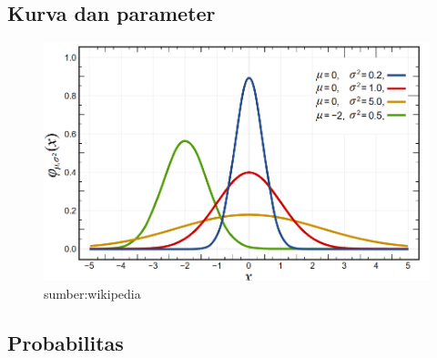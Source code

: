 \documentclass[
  letterpaper,
  DIV=11,
  numbers=noendperiod]{scrartcl}
\begin{document}
\subsection{Kurva dan parameter}\label{kurva-dan-parameter}

\begin{figure}[H]

{\centering \includegraphics{normal.png}

}

\caption{sumber:wikipedia}

\end{figure}%

\subsection{Probabilitas}\label{probabilitas}
\end{document}
